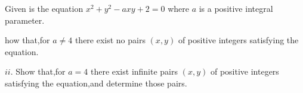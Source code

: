 Given is the equation $x^2+y^2-axy+2=0$ where $a$ is a positive integral parameter.

how that,for $a\neq 4$ there exist no pairs $(x,y)$ of positive integers satisfying the equation.

$ii.$ Show that,for $a=4$ there exist infinite pairs $(x,y)$ of positive integers satisfying the equation,and determine those pairs.
